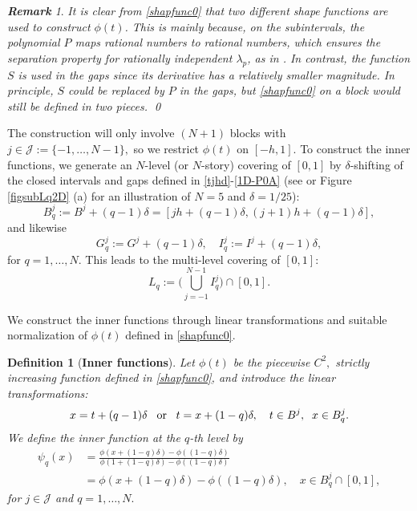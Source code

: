 \documentclass[10pt,reqno,final]{amsart}
\theoremstyle{remark}
\newtheorem{rem}{\bf Remark}[section]
\theoremstyle{definition}
\newtheorem{definition}{\bf Definition}[section]
\newcommand{\wll}[1]{#1}
\begin{document}
\begin{rem}\label{Rmk:PS} \wll{\em  It is clear from \eqref{shapfunc0} that two different shape functions are used to construct $\phi(t)$. This is mainly because, on the subintervals, the polynomial $P$ maps rational numbers to rational numbers, which ensures the separation property for rationally independent $\lambda_p$, as in \cite{Kahane1975,Igelnik2003}. In contrast, the function $S$ is used in the gaps since its derivative has a relatively smaller magnitude. In principle, $S$ could be replaced by $P$ in the gaps, but \eqref{shapfunc0} on a block would still be defined in two pieces.   \qed    
}
\end{rem}



\wll{The construction will only involve $(N+1)$ blocks with $j\in {\mathcal J}:=\{-1,\ldots, N-1\},$ so we restrict $\phi(t)$ on $[-h,1].$}
To construct the inner functions,   we generate an $N$-level (or $N$-story)  covering of  $[0,1]$ by $\delta$-shifting  of the closed intervals and gaps defined in \eqref{tjhd}-\eqref{1D-P0A} (see  \cite{Kahane1975} or Figure \ref{figsubLq2D} (a) for an illustration of $N=5$ and $\delta=1/25$):
\begin{equation}\label{1D-P0qq}
 B_q^j:=B^j+(q-1)\delta= 
 [jh+(q-1)\delta,(j+1)h+(q-1)\delta],
\end{equation}
and likewise   
\begin{equation}\label{1D-G0qq} 
 G_q^j:=G^j+(q-1)\delta,\quad  I_q^j:=I^j+(q-1)\delta,
\end{equation}
for $q=1,\ldots, N.$
This leads to the multi-level  covering of $[0,1]$:
\begin{equation}\label{LqdefnL}
L_q:=\Big(\bigcup_{j=-1}^{N-1}  I_q^j\Big)\cap [0,1].
\end{equation} 

\wll{We construct  the inner functions through  linear transformations and suitable normalization of $\phi(t)$ defined in
\eqref{shapfunc0}.} 
\begin{definition}[{\bf Inner functions}]\label{Inner-fun}  \emph{Let $\phi(t)$ be the piecewise $C^2,$ strictly increasing function defined in
\eqref{shapfunc0}, and introduce the linear transformations: \begin{equation}\label{shift-coord}
x=t+(q-1)\delta\;\;\; {\rm or} \;\;\; t=x+(1-q)\delta, \quad  t\in B^j,\;\; x\in B_q^j.
\end{equation} 
We define the inner function  at the $q$-th level by
\begin{equation}\label{PsiqxAS}
\begin{split}
\psi_q(x)& =\frac{\phi(x+(1-q)\delta)- \phi((1-q)\delta)} {\phi(1+(1-q)\delta)-\phi((1-q)\delta)}\\[4pt]
&=\phi(x+(1-q)\delta)- \phi((1-q)\delta), \quad  x\in B_q^j\cap [0,1],
\end{split}
\end{equation}
 for $j\in \mathcal J$ and $q=1,\ldots, N.$} 
\end{definition}
\end{document}
